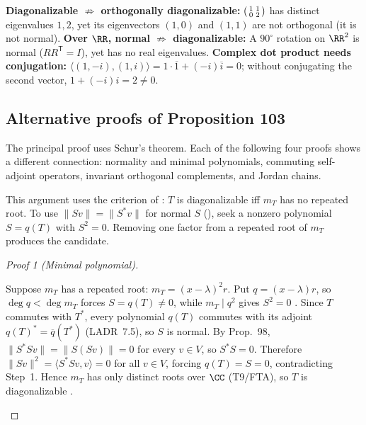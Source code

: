 \documentclass[10pt]{scrartcl}
\begin{document}
\begin{trapbox}
  \ii \textbf{Diagonalizable $\not\Rightarrow$ orthogonally diagonalizable:} $\begin{psmallmatrix}1&1\\0&2\end{psmallmatrix}$ has distinct eigenvalues $1,2$, yet its eigenvectors $(1,0)$ and $(1,1)$ are not orthogonal (it is not normal).
  \ii \textbf{Over $\RR$, normal $\not\Rightarrow$ diagonalizable:} A $90^\circ$ rotation on $\RR^2$ is normal ($RR^{\mathsf T}=I$), yet has no real eigenvalues.
  \ii \textbf{Complex dot product needs conjugation:} $\langle(1,-i),(1,i)\rangle = 1\cdot\overline{1}+(-i)\overline{i}=0$; without conjugating the second vector, $1+(-i)i=2\neq0$.
\end{trapbox}

\subsection*{Alternative proofs of Proposition 103}
The principal proof uses Schur's theorem. Each of the following four proofs shows a different connection: normality and minimal polynomials, commuting self-adjoint operators, invariant orthogonal complements, and Jordan chains.

\begin{ideabox}
  This argument uses the criterion of : $T$ is diagonalizable iff $m_T$ has no repeated root. To use $\|Sv\|=\|S^*v\|$ for normal $S$ (), seek a nonzero polynomial $S=q(T)$ with $S^2=0$. Removing one factor from a repeated root of $m_T$ produces the candidate.
\end{ideabox}
\begin{proof}[Proof 1 (Minimal polynomial)]
  \begin{steps}
    \ii Suppose $m_T$ has a repeated root: $m_T=(x-\lambda)^2 r$. Put $q=(x-\lambda)r$, so $\deg q < \deg m_T$ forces $S=q(T)\neq0$, while $m_T\mid q^2$ gives $S^2=0$ .
    \ii Since $T$ commutes with $T^*$, every polynomial $q(T)$ commutes with its adjoint $q(T)^*=\overline{q}(T^*)$ (LADR~7.5), so $S$ is normal.
    \ii By Prop.~98, $\|S^*Sv\|=\|S(Sv)\|=0$ for every $v\in V$, so $S^*S=0$.
    \ii Therefore $\|Sv\|^2=\langle S^*Sv,v\rangle=0$ for all $v\in V$, forcing $q(T)=S=0$, contradicting Step~1.
    \ii Hence $m_T$ has only distinct roots over $\CC$ (T9/FTA), so $T$ is diagonalizable .
  \end{steps}
\end{proof}
\end{document}
